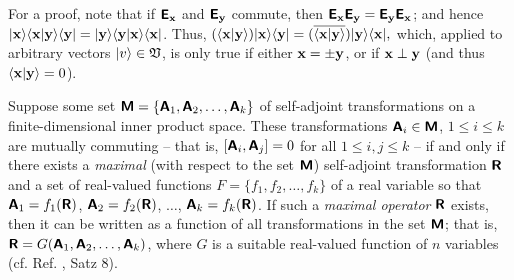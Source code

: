 {\color{OliveGreen}\bproof
For a proof,
note that if $\textsf{\textbf{E}}_{\bf x}$ and $\textsf{\textbf{E}}_{\bf y}$ commute, then
$\textsf{\textbf{E}}_{\bf x}\textsf{\textbf{E}}_{\bf y} =  \textsf{\textbf{E}}_{\bf y}    \textsf{\textbf{E}}_{\bf x}$; and
hence $
\vert {\bf x} \rangle \langle {\bf x} \vert {\bf y} \rangle \langle {\bf y} \vert
=
\vert {\bf y} \rangle \langle {\bf y} \vert {\bf x} \rangle \langle {\bf x} \vert $. Thus,
$
(
\langle {\bf x} \vert {\bf y} \rangle )\vert {\bf x} \rangle  \langle {\bf y}  \vert
=
(\overline{\langle {\bf x} \vert {\bf y} \rangle})
\vert {\bf y} \rangle  \langle {\bf x} \vert  ,
$
which, applied to arbitrary vectors $ \vert   v\rangle \in {\frak V}$, is only true if either ${\bf x} = \pm {\bf y}$,
or if ${\bf x} \perp {\bf y}$ (and thus $\langle {\bf x} \vert {\bf y} \rangle =0$).
\eproof
}



Suppose some set $\textsf{\textbf{M}}
=
\{
\textsf{\textbf{A}}_1,
\textsf{\textbf{A}}_2,
\ldots ,
\textsf{\textbf{A}}_k
\}
$
of  self-adjoint transformations on a finite-dimensional inner product space.
These  transformations  $\textsf{\textbf{A}}_i \in \textsf{\textbf{M}}$, $1\le i \le k$
are mutually commuting -- that is, $[\textsf{\textbf{A}}_i,\textsf{\textbf{A}}_j] =0$ for all $1\le i,j \le k$ -- if and only if there exists
a {\em maximal} (with respect to the set $\textsf{\textbf{M}}$) self-adjoint transformation  $\textsf{\textbf{R}}$ and
a set of real-valued functions
$F
=
\{
f_1,
f_2,
\ldots ,
f_k
\}
$ of a real variable so that
$
\textsf{\textbf{A}}_1=f_1 (\textsf{\textbf{R}})
$,
$
\textsf{\textbf{A}}_2=f_2 (\textsf{\textbf{R}})
$,
$\ldots $,
$\textsf{\textbf{A}}_k=f_k (\textsf{\textbf{R}})$.
If such a {\em maximal operator} $\textsf{\textbf{R}}$ exists, then
it can be written as a function of all transformations in the set $\textsf{\textbf{M}}$; that is,
$\textsf{\textbf{R}}=G(\textsf{\textbf{A}}_1,
\textsf{\textbf{A}}_2,
\ldots ,
\textsf{\textbf{A}}_k)$,
where $G$ is a suitable real-valued function of $n$ variables
(cf. Ref. \cite{v-neumann-31}, Satz 8).


